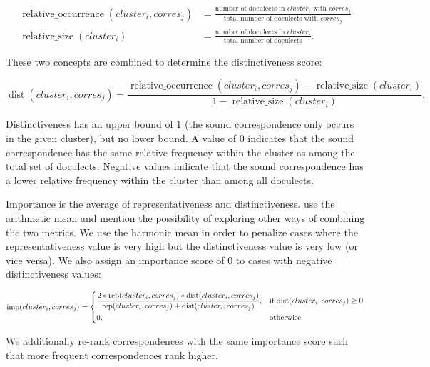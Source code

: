 \documentclass[a4paper]{article}
\begin{document}
\begin{align*}
\operatorname{relative\_occurrence}(cluster_i, corres_j) &= 
\frac{\text{number of doculects in } cluster_i \text{ with }  corres_j}
{\text{total number of doculects with } corres_j}\\
\operatorname{relative\_size}(cluster_i) &= 
\frac{\text{number of doculects in } cluster_i}
{\text{total number of doculects}}
.
\end{align*}

These two concepts are combined to determine the distinctiveness score:

\begin{equation*}
\operatorname{dist}(cluster_i, corres_j) = 
\frac{\operatorname{relative\_occurrence}(cluster_i, corres_j) - \operatorname{relative\_size}(cluster_i)}
{1 - \operatorname{relative\_size}(cluster_i)}
.
\end{equation*}

Distinctiveness has an upper bound of
$1$ (the sound correspondence only occurs in the given cluster),
but no lower bound.
A value of $0$ indicates that the sound correspondence
has the same relative frequency within the cluster
as among the total set of doculects.
Negative values indicate that the sound correspondence
has a lower relative frequency within the cluster
than among all doculects.

Importance is the average of representativeness and distinctiveness.
\citet{wieling2011bipartite} use the arithmetic mean
and mention the possibility of exploring
other ways of combining the two metrics.
We use the harmonic mean in order to penalize cases
where the representativeness value is very high
but the distinctiveness value is very low (or vice versa).
We also assign an importance score of $0$ to
cases with negative distinctiveness values:

\begin{equation*}
\operatorname{imp}(cluster_i, corres_j) = 
\begin{dcases}
\frac{
2 * \operatorname{rep}(cluster_i, corres_j) * \operatorname{dist}(cluster_i, corres_j)}
{\operatorname{rep}(cluster_i, corres_j) + \operatorname{dist}(cluster_i, corres_j)}, & \text{if dist}(cluster_i, corres_j) \geq 0\\
0, & \text{otherwise}.
\end{dcases}
\end{equation*}

We additionally re-rank correspondences
with the same importance score
such that more frequent correspondences rank higher.
\end{document}
